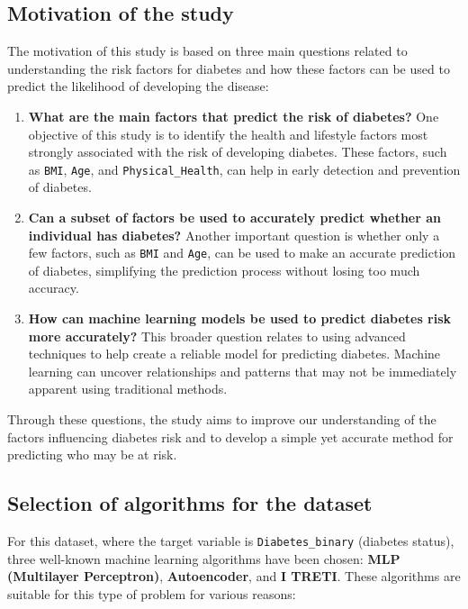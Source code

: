 \subsection{Motivation of the study}

The motivation of this study is based on three main questions related to understanding the risk factors for diabetes and how these factors can be used to predict the likelihood of developing the disease:

\begin{enumerate}
    \item \textbf{What are the main factors that predict the risk of diabetes?} One objective of this study is to identify the health and lifestyle factors most strongly associated with the risk of developing diabetes. These factors, such as \texttt{BMI}, \texttt{Age}, and \texttt{Physical\_Health}, can help in early detection and prevention of diabetes.
    
    \item \textbf{Can a subset of factors be used to accurately predict whether an individual has diabetes?} Another important question is whether only a few factors, such as \texttt{BMI} and \texttt{Age}, can be used to make an accurate prediction of diabetes, simplifying the prediction process without losing too much accuracy.
    
    \item \textbf{How can machine learning models be used to predict diabetes risk more accurately?} This broader question relates to using advanced techniques to help create a reliable model for predicting diabetes. Machine learning can uncover relationships and patterns that may not be immediately apparent using traditional methods.
\end{enumerate}

Through these questions, the study aims to improve our understanding of the factors influencing diabetes risk and to develop a simple yet accurate method for predicting who may be at risk.


\subsection{Selection of algorithms for the dataset}

For this dataset, where the target variable is \texttt{Diabetes\_binary} (diabetes status), three well-known machine learning algorithms have been chosen: \textbf{MLP (Multilayer Perceptron)}, \textbf{Autoencoder}, and \textbf{I TRETI}. These algorithms are suitable for this type of problem for various reasons:

